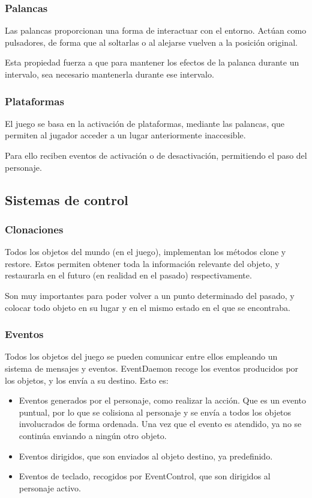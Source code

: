 \documentclass[11pt,a4paper]{article}
\begin{document}
\subsubsection{Palancas}
Las palancas proporcionan una forma de interactuar con el entorno. Actúan como 
pulsadores, de forma que al soltarlas o al alejarse vuelven a la posición 
original.

Esta propiedad fuerza a que para mantener los efectos de la palanca durante un 
intervalo, sea necesario mantenerla durante ese intervalo.

\subsubsection{Plataformas}
El juego se basa en la activación de plataformas, mediante las palancas, que 
permiten al jugador acceder a un lugar anteriormente inaccesible.

Para ello reciben eventos de activación o de desactivación, permitiendo el paso 
del personaje.

\subsection{Sistemas de control}

\subsubsection{Clonaciones}

Todos los objetos del mundo (en el juego), implementan los métodos clone y 
restore. Estos permiten obtener toda la información relevante del objeto, y 
restaurarla en el futuro (en realidad en el pasado) respectivamente.

Son muy importantes para poder volver a un punto determinado del pasado, y 
colocar todo objeto en su lugar y en el mismo estado en el que se encontraba.

\subsubsection{Eventos}

Todos los objetos del juego se pueden comunicar entre ellos empleando un sistema 
de mensajes y eventos. EventDaemon recoge los eventos producidos por los 
objetos, y los envía a su destino. Esto es:

\begin{itemize}
\item Eventos generados por el personaje, como realizar la acción. Que es un 
evento puntual, por lo que se colisiona al personaje y se envía a todos los 
objetos involucrados de forma ordenada. Una vez que el evento es atendido, ya no 
se continúa enviando a ningún otro objeto.

\item Eventos dirigidos, que son enviados al objeto destino, ya predefinido.

\item Eventos de teclado, recogidos por EventControl, que son dirigidos al 
personaje activo.
\end{itemize}
\end{document}
